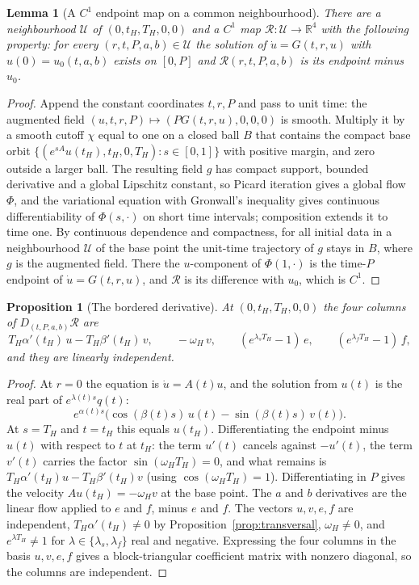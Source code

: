 \documentclass[11pt,a4paper]{article}
\theoremstyle{plain}
\newtheorem{proposition}[theorem]{Proposition}
\newtheorem{lemma}[theorem]{Lemma}
\theoremstyle{definition}
\theoremstyle{remark}
\newcommand{\R}{\mathbb{R}}
\begin{document}
\begin{lemma}[A $C^1$ endpoint map on a common neighbourhood]\label{lem:cutoff}
There are a neighbourhood $\mathcal U$ of $(0,t_H,T_H,0,0)$ and a $C^1$ map $\mathcal R\colon\mathcal U\to\R^4$ with the following property: for every $(r,t,P,a,b)\in\mathcal U$ the solution of $\dot u=G(t,r,u)$ with $u(0)=u_0(t,a,b)$ exists on $[0,P]$ and $\mathcal R(r,t,P,a,b)$ is its endpoint minus $u_0$.
\end{lemma}

\begin{proof}
Append the constant coordinates $t,r,P$ and pass to unit time: the augmented field $(u,t,r,P)\mapsto(PG(t,r,u),0,0,0)$ is smooth. Multiply it by a smooth cutoff $\chi$ equal to one on a closed ball $B$ that contains the compact base orbit $\{(e^{sA}u(t_H),t_H,0,T_H):s\in[0,1]\}$ with positive margin, and zero outside a larger ball. The resulting field $g$ has compact support, bounded derivative and a global Lipschitz constant, so Picard iteration gives a global flow $\Phi$, and the variational equation with Gronwall's inequality gives continuous differentiability of $\Phi(s,\cdot)$ on short time intervals; composition extends it to time one. By continuous dependence and compactness, for all initial data in a neighbourhood $\mathcal U$ of the base point the unit-time trajectory of $g$ stays in $B$, where $g$ is the augmented field. There the $u$-component of $\Phi(1,\cdot)$ is the time-$P$ endpoint of $\dot u=G(t,r,u)$, and $\mathcal R$ is its difference with $u_0$, which is $C^1$.
\end{proof}

\begin{proposition}[The bordered derivative]\label{prop:border}
At $(0,t_H,T_H,0,0)$ the four columns of $D_{(t,P,a,b)}\mathcal R$ are
\begin{equation}\label{eq:border}
T_H\alpha'(t_H)\,u-T_H\beta'(t_H)\,v,\qquad -\omega_H\,v,\qquad (e^{\lambda_sT_H}-1)\,e,\qquad (e^{\lambda_fT_H}-1)\,f ,
\end{equation}
and they are linearly independent.
\end{proposition}

\begin{proof}
At $r=0$ the equation is $\dot u=A(t)u$, and the solution from $u(t)$ is the real part of $e^{\lambda(t)s}q(t)$:
\[
e^{\alpha(t)s}\bigl(\cos(\beta(t)s)\,u(t)-\sin(\beta(t)s)\,v(t)\bigr).
\]
At $s=T_H$ and $t=t_H$ this equals $u(t_H)$. Differentiating the endpoint minus $u(t)$ with respect to $t$ at $t_H$: the term $u'(t)$ cancels against $-u'(t)$, the term $v'(t)$ carries the factor $\sin(\omega_HT_H)=0$, and what remains is $T_H\alpha'(t_H)u-T_H\beta'(t_H)v$ (using $\cos(\omega_HT_H)=1$). Differentiating in $P$ gives the velocity $Au(t_H)=-\omega_Hv$ at the base point. The $a$ and $b$ derivatives are the linear flow applied to $e$ and $f$, minus $e$ and $f$. The vectors $u,v,e,f$ are independent, $T_H\alpha'(t_H)\ne0$ by Proposition~\ref{prop:transversal}, $\omega_H\ne0$, and $e^{\lambda T_H}\ne1$ for $\lambda\in\{\lambda_s,\lambda_f\}$ real and negative. Expressing the four columns in the basis $u,v,e,f$ gives a block-triangular coefficient matrix with nonzero diagonal, so the columns are independent.
\end{proof}
\end{document}
